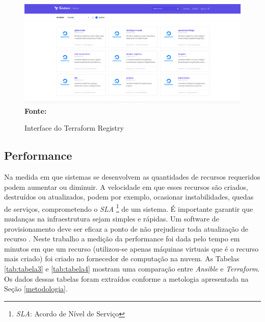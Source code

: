 \begin{figure}[H]
	\centering	
	\caption[\hspace{0.1cm} Interface do Terraform Registry]{Interface do Terraform Registry}
	\vspace{-0.4cm}
	\includegraphics[width=1.0\textwidth]{artigo/figuras/terraform_registy.png}
	 \vspace{-0.2cm}
	\\\textbf{\footnotesize Fonte: \cite{terraform_registry}}
	\label{fig:figura13}
\end{figure}
\vspace{-0.5cm}

\hfill


\subsection{Performance}
Na medida em que sistemas se desenvolvem as quantidades de recursos requeridos podem aumentar ou diminuir. A velocidade em que esses recursos são criados, destruídos ou atualizados, podem por exemplo, ocasionar instabilidades, quedas de serviços, comprometendo o \textit{SLA} \footnote{ \textit{SLA}: Acordo de Nível de Serviço} de um sistema. É importante garantir que mudanças na infraestrutura sejam simples e rápidas. Um software de provisionamento deve ser eficaz a ponto de não prejudicar toda atualização de recurso \cite{sre_google}. Neste trabalho a medição da performance foi dada pelo tempo em minutos em que um recurso (utilizou-se apenas máquinas virtuais que é o recurso mais criado) foi criado no fornecedor de computação na nuvem. As Tabelas \ref{tab:tabela3} e \ref{tab:tabela4} mostram uma comparação entre \textit{Ansible} e \textit{Terraform}. 
Os dados dessas tabelas foram extraídos conforme a metologia apresentada na Seção \ref{metodologia}.

